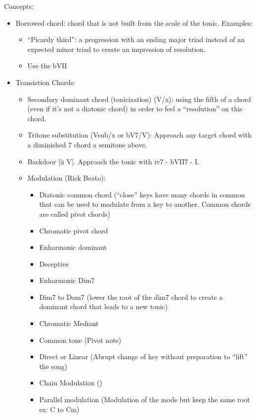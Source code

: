 \documentclass{article}
\begin{document}
Concepts:
\begin{itemize}
	\item Borrowed chord: chord that is not built from the scale of the tonic. Examples:
	\begin{itemize}
		\item ``Picardy third'': a progression with an ending major triad instead of an expected minor triad to create an impression of resolution.
		\item Use the bVII
	\end{itemize}
	\item Transistion Chords:
	\begin{itemize}
		\item Secondary dominant chord (tonicization) (V/x): using the fifth of a chord (even if it's not a diatonic chord) in order to feel a ``resolution'' on this chord.
		\item Tritone substitution (Vsub/x or bV7/V): Approach any target chord with a diminished 7 chord a semitone above.
		\item Backdoor [ii V]. Approach the tonic with iv7 - bVII7 - I.
		\item Modulation (Rick Beato):
		\begin{itemize}
			\item Diatonic common chord (``close'' keys have many chords in common that can be used to modulate from a key to another. Common chords are called pivot chords)
			\item Chromatic pivot chord
			\item Enharmonic dominant
			\item Deceptive
			\item Enharmonic Dim7
			\item Dim7 to Dom7 (lower the root of the dim7 chord to create a dominant chord that leads to a new tonic)
			\item Chromatic Mediant
			\item Common tone (Pivot note)
			\item Direct or Linear (Abrupt change of key without preparation to ``lift'' the song)
			\item Chain Modulation ()
			\item Parallel modulation (Modulation of the mode but keep the same root ex: C to Cm)
		\end{itemize}
	\end{itemize}
\end{itemize}
\end{document}
